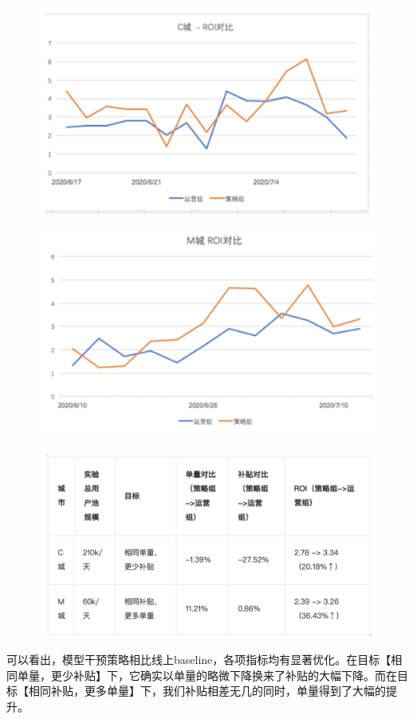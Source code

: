 \documentclass[12pt]{article}
\begin{document}
\begin{figure}[H]
    \centering
    \includegraphics[width=.8\textwidth]{fig/Casual_Inference_In_Didi_19.png}
\end{figure}
\begin{figure}[H]
    \centering
    \includegraphics[width=.8\textwidth]{fig/Casual_Inference_In_Didi_20.png}
\end{figure}
\begin{figure}[H]
    \centering
    \includegraphics[width=.8\textwidth]{fig/Casual_Inference_In_Didi_21.png}
\end{figure}

可以看出，模型干预策略相比线上baseline，各项指标均有显著优化。在目标【相同单量，更少补贴】下，它确实以单量的略微下降换来了补贴的大幅下降。而在目标【相同补贴，更多单量】下，我们补贴相差无几的同时，单量得到了大幅的提升。
\end{document}
